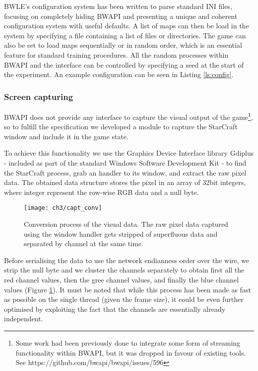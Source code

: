 BWLE's configuration system has been written to parse standard INI files,
focusing on completely hiding BWAPI and presenting a unique and coherent
configuration system with useful defaults. A list of maps can then be load in
the system by specifying a file containing a list of files or directories. The
game can also be set to load maps sequentially or in random order, which is an
essential feature for standard training procedures. All the random processes
within BWAPI and the interface can be controlled by specifying a seed at the
start of the experiment. An example configuration can be seen in Listing
\ref{ls:config}.


\subsubsection{Screen capturing}


BWAPI does not provide any interface to capture the visual output of the
game\footnote{Some work had been previously done to integrate some form of
  streaming functionality within BWAPI, but it was dropped in favour of existing
  tools. See https://github.com/bwapi/bwapi/issues/596}, so to fulfill the
specification we developed a module to capture the StarCraft window and include
it in the game state.

To achieve this functionality we use the Graphics Device Interface library
Gdiplus - included as part of the standard Windows Software Development Kit - to
find the StarCraft process, grab an handler to its window, and extract the raw
pixel data. The obtained data structure stores the pixel in an array of 32bit
integers, where integer represent the row-wise RGB data and a null byte.

\begin{figure}[h]
    \centering
    \texttt{[image: ch3/capt\_conv]}
    \caption{Conversion process of the visual data. The raw pixel data captured
      using the window handler gets stripped of superfluous data and separated
      by channel at the same time.}
    \label{fig:capt_conv}
\end{figure}

Before serialising the data to use the network endianness order over the wire,
we strip the null byte and we cluster the channels separately to obtain first
all the red channel values, then the gree channel values, and finally the blue
channel values (Figure \ref{fig:capt_conv}). It must be noted that while this
process has been made as fast as possible on the single thread (given the frame
size), it could be even further optimised by exploiting the fact that the
channels are essentially already independent. 

